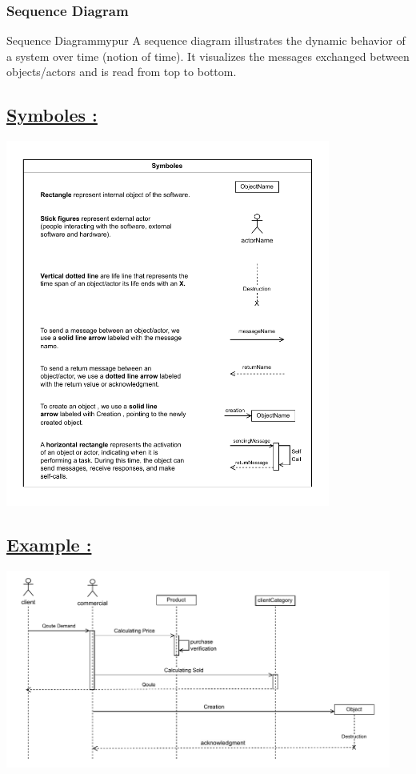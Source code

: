 \vspace{1cm}
\subsubsection{Sequence Diagram}


\begin{prettyBox}{Sequence Diagram}{mypur}
A sequence diagram illustrates the dynamic behavior of a system over time (notion of time). 
It visualizes the messages exchanged between objects/actors and is read from top to bottom.
\end{prettyBox}

\subsection*{\underline{Symboles :}}

\begin{center}
\includegraphics[width=0.8\textwidth]{Chapters/Diagram/SQD/sym.drawio.pdf}
\end{center}


\subsection*{\underline{Example :}}

\vspace{0.25cm}
\begin{center}
\includegraphics[width=0.95\textwidth]{Chapters/Diagram/SQD/sqd.drawio.pdf}
\end{center}


